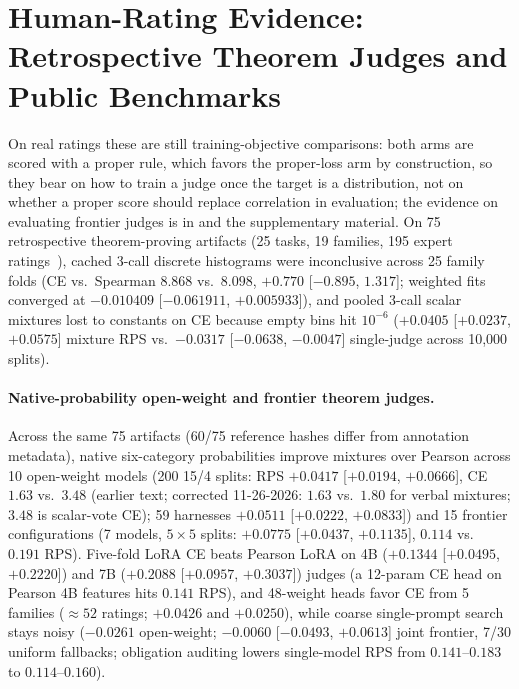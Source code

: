 \section{Human-Rating Evidence: Retrospective Theorem Judges and Public Benchmarks}
\label{sec:case}
On real ratings these are still training-objective comparisons: both arms are scored with a proper rule, which favors the proper-loss arm by construction, so they bear on how to train a judge once the target is a distribution, not on whether a proper score should replace correlation in evaluation; the evidence on evaluating frontier judges is in  and the supplementary material.
On 75 retrospective theorem-proving artifacts (25 tasks, 19 families, 195 expert ratings~\citep{companion2026}), cached 3-call discrete histograms were inconclusive across 25 family folds (CE vs.\ Spearman $8.868$ vs.\ $8.098$, $+0.770$ [$-0.895$, $1.317$]; weighted fits~\citep{companionweighted2026} converged at $-0.010409$ [$-0.061911$, $+0.005933$]), and pooled 3-call scalar mixtures lost to constants on CE because empty bins hit $10^{-6}$ ($+0.0405$ [$+0.0237$, $+0.0575$] mixture RPS vs.\ $-0.0317$ [$-0.0638$, $-0.0047$] single-judge across 10,000 splits).
\paragraph{Native-probability open-weight and frontier theorem judges.}
Across the same 75 artifacts (60/75 reference hashes differ from annotation metadata), native six-category probabilities improve mixtures over Pearson across 10 open-weight models (200 15/4 splits: RPS $+0.0417$ [$+0.0194$, $+0.0666$], CE $1.63$ vs.\ $3.48$ (earlier text; corrected 11-26-2026: $1.63$ vs.\ $1.80$ for verbal mixtures; $3.48$ is scalar-vote CE); 59 harnesses $+0.0511$ [$+0.0222$, $+0.0833$]) and 15 frontier configurations (7 models, $5\times 5$ splits: $+0.0775$ [$+0.0437$, $+0.1135$], $0.114$ vs.\ $0.191$ RPS). Five-fold LoRA CE beats Pearson LoRA on 4B ($+0.1344$ [$+0.0495$, $+0.2220$]) and 7B ($+0.2088$ [$+0.0957$, $+0.3037$]) judges (a 12-param CE head on Pearson 4B features hits $0.141$ RPS), and 48-weight heads favor CE from 5 families ($\approx 52$ ratings; $+0.0426$ and $+0.0250$), while coarse single-prompt search stays noisy ($-0.0261$ open-weight; $-0.0060$ [$-0.0493$, $+0.0613$] joint frontier, 7/30 uniform fallbacks; obligation auditing lowers single-model RPS from $0.141$--$0.183$ to $0.114$--$0.160$).

